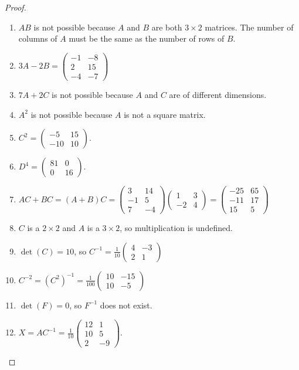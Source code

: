 \documentclass[oneside]{book}
\theoremstyle{mystyle}
\begin{document}
\begin{proof}
\
\begin{enumerate}
    \item $AB$ is not possible because $A$ and $B$ are both $3\times 2$ matrices. The number of columns of $A$ must be the same as the number of rows of $B$.
    \item $3A-2B = \begin{pmatrix}-1 & -8\\ 2 & 15\\ -4 & -7 \end{pmatrix}$
    \item $7A+2C$ is not possible because $A$ and $C$ are of different dimensions.
    \item $A^2$ is not possible because $A$ is not a square matrix.
    \item $C^2 = \begin{pmatrix} -5 & 15 \\ -10 & 10\end{pmatrix}$.
    \item $D^4 = \begin{pmatrix} 81 & 0 \\ 0 & 16\end{pmatrix}$. 
    \item $AC+BC = (A+B)C = \begin{pmatrix} 3 & 14 \\ -1 & 5 \\ 7 & -4 \end{pmatrix} \begin{pmatrix} 1 & 3 \\ -2 & 4 \end{pmatrix} = \begin{pmatrix} -25 & 65 \\ -11 & 17 \\ 15 & 5 \end{pmatrix}$
    \item $C$ is a $2\times 2$ and $A$ is a $3\times 2$, so multiplication is undefined.
    \item $\det(C) = 10$, so $C^{-1} = \frac{1}{10}\begin{pmatrix} 4 & -3 \\ 2 & 1 \end{pmatrix}$
    \item $C^{-2} = (C^2)^{-1} = \frac{1}{100}\begin{pmatrix}10 & -15 \\ 10 & -5\end{pmatrix}$
    \item $\det(F) = 0$, so $F^{-1}$ does not exist. 
    \item $X = AC^{-1} = \frac{1}{10}\begin{pmatrix}12 & 1\\10 & 5\\ 2 & -9\end{pmatrix}$.
\end{enumerate}
\end{proof}
\end{document}
